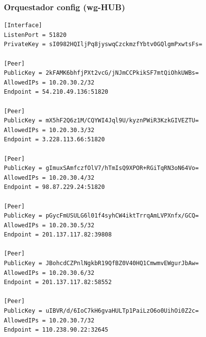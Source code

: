 \documentclass[11pt,a4paper]{article}
\begin{document}
\subsubsection*{Orquestador config (wg-HUB)}
\begin{lstlisting}
[Interface]
ListenPort = 51820
PrivateKey = sI0982HQIljPq8jyswqCzckmzfYbtv0GQlgmPxwtsFs=

[Peer]
PublicKey = 2kFAMK6bhfjPXt2vcG/jNJmCCPkikSF7mtQiOhkUWBs=
AllowedIPs = 10.20.30.2/32
Endpoint = 54.210.49.136:51820

[Peer]
PublicKey = mX5hF2Q6z1M/CQYWI4Jql9U/kyznPWiR3KzkGIVEZTU=
AllowedIPs = 10.20.30.3/32
Endpoint = 3.228.113.66:51820

[Peer]
PublicKey = gImuxSAmfczfOlV7/hTmIsQ9XPOR+RGiTqRN3oN64Vo=
AllowedIPs = 10.20.30.4/32
Endpoint = 98.87.229.24:51820

[Peer]
PublicKey = pGycFmUSULG6l01f4syhCW4iktTrrqAmLVPXnfx/GCQ=
AllowedIPs = 10.20.30.5/32
Endpoint = 201.137.117.82:39808

[Peer]
PublicKey = JBohcdCZPnlNgkbR19QfBZ0V40HQ1CmwmvEWgurJbAw=
AllowedIPs = 10.20.30.6/32
Endpoint = 201.137.117.82:58552

[Peer]
PublicKey = uIBVR/d/6IoC7kH6gvaHULTp1PaiLzO6o0UihOi0Z2c=
AllowedIPs = 10.20.30.7/32
Endpoint = 110.238.90.22:32645

\end{lstlisting}
\end{document}

